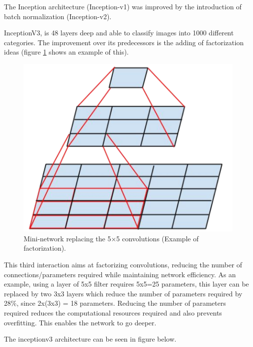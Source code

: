     \par The Inception architecture (Inception-v1) was improved by the introduction of batch normalization (Inception-v2). \cite{Ribeiro}


    InceptionV3, is 48 layers deep and able to classify images into 1000 different categories. The improvement over its predecessors is the adding of factorization ideas (figure \ref{fig:factorization} shows an example of this). 

    \begin{figure}[htb]
        \centering
        \includegraphics[scale = 0.15]{Sections/2StateOfTheArt/2_images/factor_inception.png}
        \caption{Mini-network replacing the 5×5 convolutions (Example of factorization). \cite{Szegedy2016}} 
        \label{fig:factorization}
    \end{figure}


    \par This third interaction aims at factorizing convolutions, reducing the number of connections/parameters required while maintaining network efficiency. As an example, using a layer of 5x5 filter requires 5x5=25 parameters, this layer can be replaced by two 3x3 layers which reduce the number of parameters required by 28\%, since 2x(3x3) = 18 parameters. Reducing the number of parameters required reduces the computational resources required and also prevents overfitting. This enables the network to go deeper. \cite{inceptionV3web} 
    \par The inceptionv3 architecture can be seen in figure  below.
  

